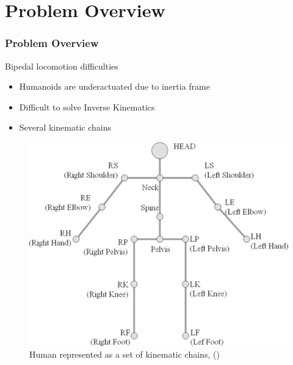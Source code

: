 \documentclass{beamer}
\begin{document}
	\section*{Problem Overview}
		\begin{frame}
			\frametitle{Problem Overview}
			\begin{block}{Bipedal locomotion difficulties}
				\begin{itemize}
					\item
						Humanoids are underactuated due to inertia frame
					\item
						Difficult to solve Inverse Kinematics
					\item
						Several kinematic chains
				\end{itemize}
			\end{block}
			
			\begin{figure}[h!]
				\begin{minipage}[H]{\linewidth}
					\centering
					\includegraphics[scale=0.5]{presentation_images/7}
					\caption{Human represented as a set of kinematic chains, (\cite{seo2011improved})}
				\end{minipage}
			\end{figure}
		\end{frame}

\end{document}
